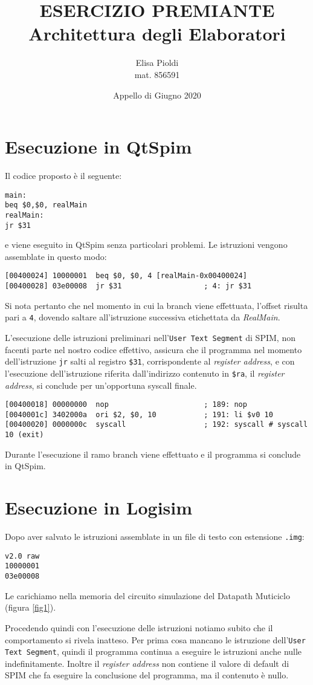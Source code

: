 \documentclass[a4paper]{article}
\date{Appello di Giugno 2020}
\author{Elisa Pioldi\\mat. 856591}
\title{\textbf{ESERCIZIO PREMIANTE\\Architettura degli Elaboratori}}
\begin{document}
%
\maketitle
%
\section{Esecuzione in QtSpim}
Il codice proposto è il seguente:
\begin{verbatim}
main:
beq $0,$0, realMain
realMain:
jr $31
\end{verbatim}
e viene eseguito in QtSpim senza particolari problemi. Le istruzioni vengono assemblate in questo modo:
\begin{verbatim}
[00400024] 10000001  beq $0, $0, 4 [realMain-0x00400024]
[00400028] 03e00008  jr $31                   ; 4: jr $31 
\end{verbatim}
Si nota pertanto che nel momento in cui la branch viene effettuata, l'offset risulta pari a \texttt{4}, dovendo saltare all'istruzione successiva etichettata da {\itshape RealMain}.

L'esecuzione delle istruzioni preliminari nell'\texttt{User Text Segment} di SPIM, non facenti parte nel nostro codice effettivo, assicura che il programma nel momento dell'istruzione \texttt{jr} salti al registro \texttt{\$31}, corrispondente al {\itshape register address}, e con l'esecuzione dell'istruzione riferita dall'indirizzo contenuto in \texttt{\$ra}, il {\itshape register address}, si conclude per un'opportuna syscall finale.
\begin{verbatim}
[00400018] 00000000  nop                      ; 189: nop 
[0040001c] 3402000a  ori $2, $0, 10           ; 191: li $v0 10 
[00400020] 0000000c  syscall                  ; 192: syscall # syscall 10 (exit) 
\end{verbatim}
Durante l'esecuzione il ramo branch viene effettuato e il programma si conclude in QtSpim.
%
\section{Esecuzione in Logisim}
Dopo aver salvato le istruzioni assemblate in un file di testo con estensione \texttt{.img}:
\begin{verbatim}
v2.0 raw
10000001
03e00008
\end{verbatim}
Le carichiamo nella memoria del circuito simulazione del Datapath Muticiclo (figura \ref{fig1}).

Procedendo quindi con l'esecuzione delle istruzioni notiamo subito che il comportamento si rivela inatteso.
Per prima cosa mancano le istruzione dell'\texttt{User Text Segment}, quindi il programma continua a eseguire le istruzioni anche nulle indefinitamente. Inoltre il {\itshape register address} non contiene il valore di default di SPIM che fa eseguire la conclusione del programma, ma il contenuto è nullo.
\end{document}
